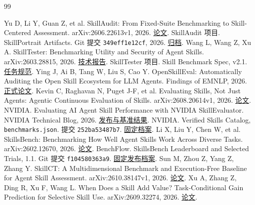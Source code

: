 \documentclass[final,5p,twocolumn,10pt]{elsarticle}
\newcommand{\code}[1]{\texttt{#1}}
\begin{document}
\begin{thebibliography}{99}
\raggedright
{} Yu D, Li Y, Guan Z, et al. SkillAudit: From Fixed-Suite Benchmarking to Skill-Centered Assessment. arXiv:2606.22613v1, 2026. \href{https://arxiv.org/abs/2606.22613v1}{论文}.
 SkillAudit 项目. SkillPortrait Artifacts. Git 提交 \code{349eff1e12cf}, 2026. \href{https://github.com/SkillAudit/skillaudit/tree/349eff1e12cf6f210aa9b865a9e865b948b5a89b/docs/artifacts/data}{归档}.
 Wang L, Wang Z, Xu A. SkillTester: Benchmarking Utility and Security of Agent Skills. arXiv:2603.28815, 2026. \href{https://arxiv.org/abs/2603.28815}{技术报告}.
 SkillTester 项目. Skill Benchmark Spec, v2.1. \href{https://github.com/skilltester-ai/skilltester/blob/main/AgentKit/Skill_Benchmark_Spec/Skill_Benchmark_Spec.md}{任务规范}.
 Ying J, Ai B, Tang W, Liu S, Cao Y. OpenSkillEval: Automatically Auditing the Open Skill Ecosystem for LLM Agents. Findings of EMNLP, 2026. \href{https://aclanthology.org/2026.findings-emnlp.1554/}{正式论文}.
 Kevin C, Raghavan N, Puget J-F, et al. Evaluating Skills, Not Just Agents: Agentic Continuous Evaluation of Skills. arXiv:2608.20614v1, 2026. \href{https://arxiv.org/abs/2608.20614v1}{论文}.
 NVIDIA. Evaluating AI Agent Skill Performance with NVIDIA SkillEvaluator. NVIDIA Technical Blog, 2026. \href{https://developer.nvidia.com/blog/evaluating-ai-agent-skill-performance-with-nvidia-skillevaluator/}{发布与基准结果}.
 NVIDIA. Verified Skills Catalog, \code{benchmarks.json}. 提交 \code{252ba53487b7}. \href{https://github.com/NVIDIA/skills/blob/252ba53487b73eaafbfcccf3e750c7b350b93db9/benchmarks.json}{固定档案}.
 Li X, Liu Y, Chen W, et al. SkillsBench: Benchmarking How Well Agent Skills Work Across Diverse Tasks. arXiv:2602.12670, 2026. \href{https://arxiv.org/abs/2602.12670}{论文}.
 BenchFlow. SkillsBench Leaderboard and Selected Trials, 1.1. Git 提交 \code{f104580363a9}. \href{https://huggingface.co/datasets/benchflow/skillsbench-leaderboard/tree/f104580363a9642563593c475620196ecd36687d}{固定发布档案}.
 Sun M, Zhou Z, Yang Z, Zhang Y. SkillCT: A Multidimensional Benchmark and Execution-Free Baseline for Agent Skill Assessment. arXiv:2610.38147v1, 2026. \href{https://arxiv.org/abs/2610.38147v1}{论文}.
 Xu A, Zhang Z, Ding R, Xu F, Wang L. When Does a Skill Add Value? Task-Conditional Gain Prediction for Selective Skill Use. arXiv:2609.32274, 2026. \href{https://arxiv.org/abs/2609.32274}{论文}.

\end{thebibliography}
\end{document}
